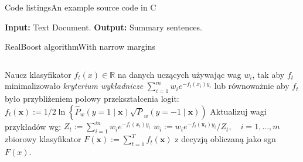 \documentclass{beamer}
\begin{document}
\begin{frame}{Code listings}{An example source code in C}
    \sleepSort
\end{frame}

\begin{frame}
	\begin{algorithm}[H]
		\caption{Text Summarization Algorithm}\label{euclid}
		\begin{algorithmic}[1]
			\newline
			\textbf{Input:} Text Document.\newline
			\textbf{Output:} Summary sentences.
			\EndProcedure
		\end{algorithmic}
		\label{alg_1}
	\end{algorithm}
\end{frame}

\begin{frame}{RealBoost algorithm}{With narrow margins}
	  \begin{columns}
		\column{\dimexpr\paperwidth-10pt}
		\begin{algorithm}[H]
			\caption{Algorytm RealBoost}\label{realboost}
			\small
			\begin{algorithmic}[1]
					\State Naucz klasyfikator $f_t(x) \in \mathds{R}$ na danych uczących używając wag $w_i$, tak aby $f_t$ minimalizowało \emph{kryterium wykładnicze} $\sum_{i=1}^{m} w_i e^{-f_t(x_i)y_i}$ lub równoważnie aby $f_t$ było przybliżeniem połowy przekształcenia logit:
					\Statex $f_{t}(\mathbf{x}):=1 / 2 \ln \left\{\widehat{P}_{w}(y=1 \mid \mathbf{x}) \sqrt{P}_{w}(y=-1 \mid \mathbf{x})\right)$
					\State Aktualizuj wagi przykładów wg:
					\Statex $Z_{t}:=\sum_{i=1}^{i n} w_{i} e^{-f_{i}\left(x_{i}\right) y_{i}}$
					\Statex $w_{i}:=w_{i} e^{-f_{i}\left(\mathbf{x}_{i}\right) y_{i}} / Z_{t}, \quad i=1, \ldots, m$
				\EndFor\\
				\Return zbiorowy klasyfikator $F(\mathbf{x}):=\sum_{t=1}^{T} f_{t}(\mathbf{x})$ z decyzją obliczaną jako sgn $F(x)$.
				\EndProcedure
			\end{algorithmic}
			\label{alg_2}
		\end{algorithm}
	\end{columns}
\end{frame}
\end{document}
